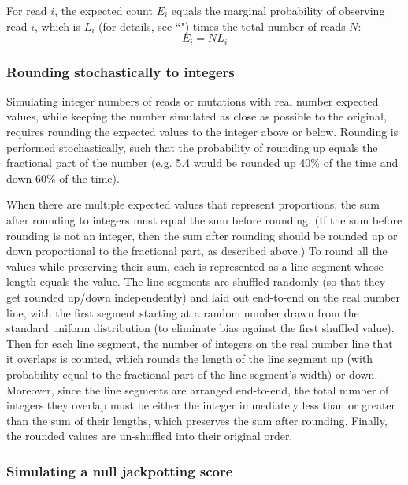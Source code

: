 \documentclass{article}
\begin{document}
For read $i$, the expected count $E_i$ equals the marginal probability of observing read $i$, which is $L_i$ (for details, see ``") times the total number of reads $N$:
\begin{equation}
    E_i = NL_i
\end{equation}

\subsubsection{Rounding stochastically to integers}
\label{stochastic-round}

Simulating integer numbers of reads or mutations with real number expected values, while keeping the number simulated as close as possible to the original, requires rounding the expected values to the integer above or below.
Rounding is performed stochastically, such that the probability of rounding up equals the fractional part of the number (e.g. 5.4 would be rounded up 40\% of the time and down 60\% of the time).

When there are multiple expected values that represent proportions, the sum after rounding to integers must equal the sum before rounding.
(If the sum before rounding is not an integer, then the sum after rounding should be rounded up or down proportional to the fractional part, as described above.)
To round all the values while preserving their sum, each is represented as a line segment whose length equals the value.
The line segments are shuffled randomly (so that they get rounded up/down independently) and laid out end-to-end on the real number line, with the first segment starting at a random number drawn from the standard uniform distribution (to eliminate bias against the first shuffled value).
Then for each line segment, the number of integers on the real number line that it overlaps is counted, which rounds the length of the line segment up (with probability equal to the fractional part of the line segment's width) or down.
Moreover, since the line segments are arranged end-to-end, the total number of integers they overlap must be either the integer immediately less than or greater than the sum of their lengths, which preserves the sum after rounding.
Finally, the rounded values are un-shuffled into their original order.

\subsubsection{Simulating a null jackpotting score}
\label{sim-null-jackpotting-score}
\end{document}
